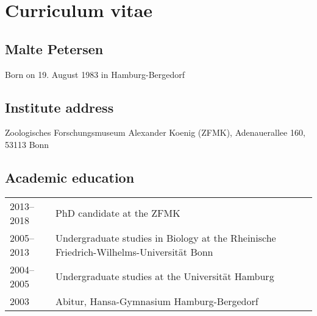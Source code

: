 \chapter*{Curriculum vitae}

\section*{Malte Petersen}

Born on 19. August 1983 in Hamburg-Bergedorf

\section*{Institute address}

Zoologisches Forschungsmuseum Alexander Koenig (ZFMK), Adenauerallee 160, 53113 Bonn

\section*{Academic education}

\begin{tabular}[h]{l l}
2013--2018 & PhD candidate at the ZFMK \\
2005--2013 & Undergraduate studies in Biology at the Rheinische Friedrich-Wilhelms-Universität Bonn\\
2004--2005 & Undergraduate studies at the Universität Hamburg\\
2003       & Abitur, Hansa-Gymnasium Hamburg-Bergedorf \\
\end{tabular}
